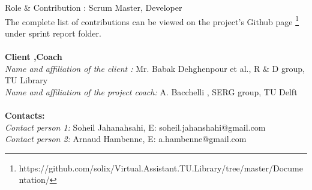    Role \& Contribution : Scrum Master, Developer\\
 The complete list of contributions can be viewed on the project's Github page \footnote{https://github.com/solix/Virtual.Assistant.TU.Library/tree/master/Documentation/} under sprint report folder.\\\\
\textbf{Client ,Coach \\}
\textit{Name and affiliation of the client : } Mr. Babak Dehghenpour et al., R \& D group, TU Library\\
\textit{Name and affiliation of the project coach:} A. Bacchelli , SERG group, TU Delft \\\\
\textbf{Contacts: \\}
\textit{Contact person 1: } Soheil Jahanahsahi, E: soheil.jahanshahi@gmail.com \\
\textit{Contact person 2: } Arnaud Hambenne, E: a.hambenne@gmail.com 



